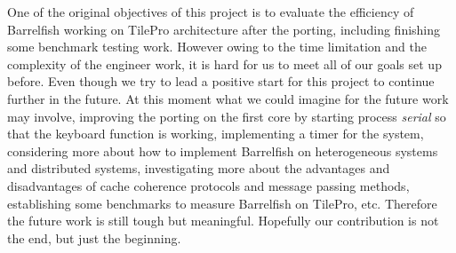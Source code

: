 \documentclass[a4paper,twoside]{report} %
\begin{document}
One of the original objectives of this project is to evaluate the efficiency of Barrelfish working on TilePro architecture after the porting, including finishing some benchmark testing work. However owing to the time limitation and the complexity of the engineer work, it is hard for us to meet all of our goals set up before. Even though we try to lead a positive start for this project to continue further in the future. At this moment what we could imagine for the future work may involve, improving the porting on the first core by starting process \emph{serial} so that the keyboard function is working, implementing a timer for the system, considering more about how to implement Barrelfish on heterogeneous systems and distributed systems, investigating more about the advantages and disadvantages of cache coherence protocols and message passing methods, establishing some benchmarks to measure Barrelfish on TilePro, etc. Therefore the future work is still tough but meaningful. Hopefully our contribution is not the end, but just the beginning.
\end{document}
